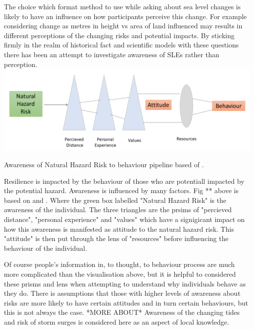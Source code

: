 \documentclass{article}
\begin{document}
The choice which format method to use while asking about sea level changes is likely to have an influence on how participants perceive this change. For example considering change as metres in height vs area of land influenced may results in different perceptions of the changing risks and potential impacts.  By sticking firmly in the realm of historical fact and scientific models with these questions there has been an attempt to investigate awareness of SLEs rather than perception. 
\includegraphics[width=1\textwidth]{fig_theory/awareness lujala and whitmarsh.png}

\begin{frame}{Awareness of Natural Hazard Risk to behaviour pipeline based of \cite{lujala_climate_2015}\cite{whitmarsh_are_2008}.}
\end{frame}

Resilience is impacted by the behaviour of those who are potentiall impacted by the potential hazard. Awareness is influenced by many factors. Fig ** above is based on \cite{whitmarsh_are_2008} and \cite{lujala_climate_2015} . Where the green box labelled "Natural Hazard Risk" is the awareness of the individual. The three triangles are the prsims of "percieved distance", "personal experience" and "values" which have a signigicant impact on how this awareness is manifested as attitude to the natural hazard risk. This "attitude" is then put through the lens of "resources" before influencing the behaviour of the individual. 

Of course people's information in, to thought, to behaviour process are much more complicated than the visualisation above, but it is helpful to considered these prisms and lens when attempting to understand why individuals behave as they do. There is assumptions that those with higher levels of awareness about risks are more likely to have certain attitudes and in turn certain behaviours, but this is not always the case. 
*MORE ABOUT*\cite{lujala_climate_2015}  Awareness of the changing tides and risk of storm surges is considered here as an aspect of local knowledge. 
\end{document}
